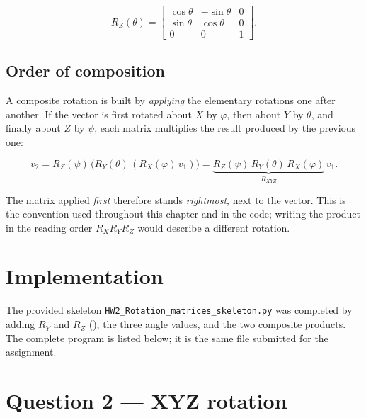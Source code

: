 \begin{equation}
\label{eq:hw2-rz}
R_Z(\theta) =
\begin{bmatrix}
\cos\theta & -\sin\theta & 0 \\
\sin\theta & \cos\theta & 0 \\
0 & 0 & 1
\end{bmatrix}.
\end{equation}

\subsection{Order of composition}
\label{sec:hw2-order}

A composite rotation is built by \emph{applying} the elementary rotations one
after another. If the vector is first rotated about $X$ by $\varphi$, then about
$Y$ by $\theta$, and finally about $Z$ by $\psi$, each matrix multiplies the
result produced by the previous one:

\begin{equation}
\label{eq:hw2-order}
v_2 = R_Z(\psi)\,\bigl(R_Y(\theta)\,(R_X(\varphi)\,v_1)\bigr)
    = \underbrace{R_Z(\psi)\,R_Y(\theta)\,R_X(\varphi)}_{R_{XYZ}}\,v_1 .
\end{equation}

The matrix applied \emph{first} therefore stands \emph{rightmost}, next to the
vector. This is the convention used throughout this chapter and in the code;
writing the product in the reading order $R_X R_Y R_Z$ would describe a
different rotation.

\clearpage
\section{Implementation}
\label{sec:hw2-impl}

The provided skeleton \texttt{HW2\_Rotation\_matrices\_skeleton.py} was completed
by adding $R_Y$ and $R_Z$ (), the three angle values,
and the two composite products. The complete program is listed below; it is the
same file submitted for the assignment.



\section{Question 2 --- XYZ rotation}
\label{sec:hw2-q2}

